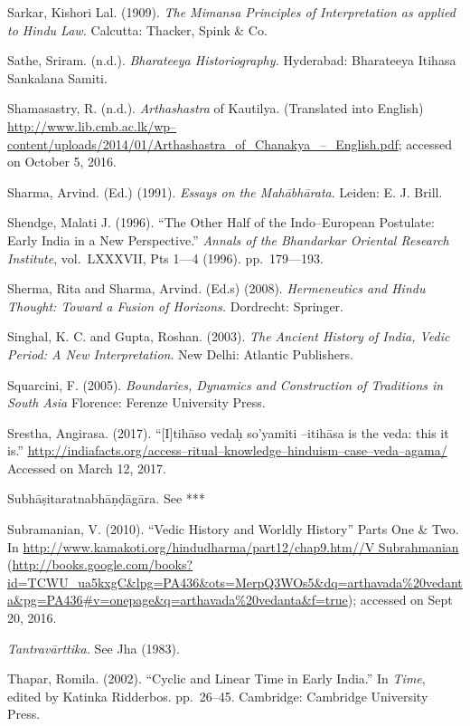 \begin{thebibliography}{99}
  Sarkar, Kishori Lal. (1909). \textit{The Mimansa Principles of Interpretation as applied to Hindu Law.} Calcutta: Thacker, Spink \& Co. 

  Sathe, Sriram. (n.d.). \textit{Bharateeya Historiography.} Hyderabad: Bharateeya Itihasa Sankalana Samiti.

  Shamasastry, R. (n.d.). \textit{Arthashastra} of Kautilya. (Translated into English) \url{http://www.lib.cmb.ac.lk/wp–content/uploads/2014/01/Arthashastra_of_Chanakya_–_English.pdf}; accessed on October 5, 2016.

  Sharma, Arvind. (Ed.) (1991). \textit{Essays on the Mahābhārata}. Leiden: E. J. Brill.

  Shendge, Malati J. (1996). “The Other Half of the Indo–European Postulate: Early India in a New Perspective.” \textit{Annals of the Bhandarkar Oriental Research Institute}, vol.~LXXXVII, Pts 1––4 (1996). pp.~179––193.

  Sherma, Rita and Sharma, Arvind. (Ed.s) (2008). \textit{Hermeneutics and Hindu Thought: Toward a Fusion of Horizons.} Dordrecht: Springer.

  Singhal, K. C. and Gupta, Roshan. (2003). \textit{The Ancient History of India, Vedic Period: A New Interpretation}. New Delhi: Atlantic Publishers.

  Squarcini, F. (2005). \textit{Boundaries, Dynamics and Construction of Traditions in South Asia} Florence: Ferenze University Press.

  Srestha, Angirasa. (2017). “[I]tihāso vedaḥ so’yamiti –itihāsa is the veda: this it is.” \url{http://indiafacts.org/access–ritual–knowledge–hinduism–case–veda–agama/} Accessed on March 12, 2017.

  Subhāṣitaratnabhāṇḍāgāra. See ***

  Subramanian, V. (2010). “Vedic History and Worldly History” Parts One \& Two. In \url{http://www.kamakoti.org/hindudharma/part12/chap9.htm//V Subrahmanian} (\url{http://books.google.com/books?id=TCWU_ua5kxgC&lpg=PA436&ots=MerpQ3WOs5&dq=arthavada%20vedanta&pg=PA436#v=onepage&q=arthavada%20vedanta&f=true}); accessed on Sept 20, 2016.

  \textit{Tantravārttika.} See Jha (1983).

  Thapar, Romila. (2002). “Cyclic and Linear Time in Early India.” In \textit{Time}, edited by Katinka Ridderbos. pp.~26–45. Cambridge: Cambridge University Press.


\end{thebibliography}

